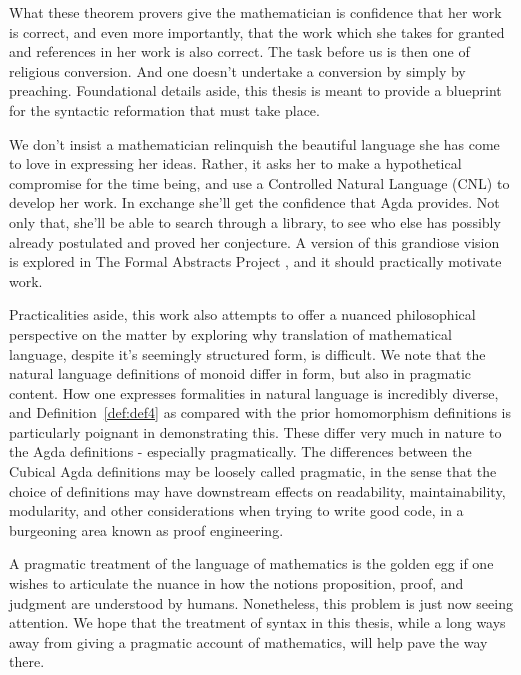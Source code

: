 What these theorem provers give the mathematician is confidence that her work
is correct, and even more importantly, that the work which she takes for
granted and references in her work is also correct. The task before us is then
one of religious conversion. And one doesn't undertake a conversion by simply
by preaching. Foundational details aside, this thesis is meant to provide a
blueprint for the syntactic reformation that must take place.  

We don't insist a mathematician relinquish the beautiful language she has
come to love in expressing her ideas.  Rather, it asks her to make a
hypothetical compromise
for the time being, and use a Controlled Natural Language (CNL) to develop her
work. In exchange she'll get the confidence that Agda provides. Not only that,
she'll be able to search through a library, to see who else has possibly
already postulated and proved her conjecture. A version of this grandiose vision is 
explored in The Formal Abstracts Project \cite{halesCNL}, and it should
practically motivate work.  

Practicalities aside, this work also attempts to offer a nuanced philosophical
perspective on the matter by exploring why translation of mathematical language,
despite it's seemingly structured form, is difficult. We note that the natural
language definitions of monoid differ in form, but also in pragmatic content.
How one expresses formalities in natural language is incredibly diverse, and
Definition~\ref{def:def4} as compared with the prior homomorphism definitions is
particularly poignant in demonstrating this. These differ very much in nature to
the Agda definitions - especially pragmatically. The differences between the Cubical
Agda definitions may be loosely called pragmatic, in the sense that the choice
of definitions may have downstream effects on readability, maintainability, modularity, and other
considerations when trying to write good code, in a burgeoning area known as proof engineering.

A pragmatic treatment of the language of mathematics is the golden egg if one
wishes to articulate the nuance in how the notions proposition, proof, and
judgment are understood by humans. Nonetheless, this problem is just now seeing
attention. We hope that the treatment of syntax in this thesis, while a long
ways away from giving a pragmatic account of mathematics, will help pave the way
there.
